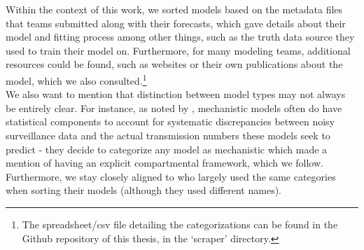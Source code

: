 Within the context of this work, we sorted models based on the metadata files that teams submitted along with their forecasts, which gave details about their model and fitting process among other things, such as the truth data source they used to train their model on. Furthermore, for many modeling teams, additional resources could be found, such as websites or their own publications about the model, which we also consulted.\footnote{The spreadsheet/csv file detailing the categorizations can be found in the Github repository of this thesis, in the `scraper' directory.} \\
We also want to mention that distinction between model types may not always be entirely clear. For instance, as noted by \cite{reich_collaborative_2019}, mechanistic models often do have statistical components to account for systematic discrepancies between noisy surveillance data and the actual transmission numbers these models seek to predict - they decide to categorize any model as mechanistic which made a mention of having an explicit compartmental framework, which we follow.
Furthermore, we stay closely aligned to \cite{bracher_pre-registered_2021} who largely used the same categories when sorting their models (although they used different names). %
